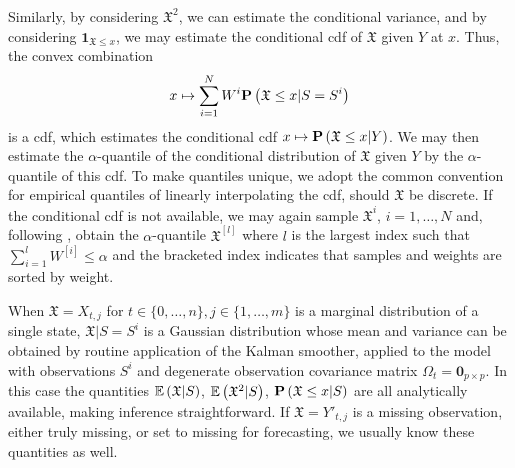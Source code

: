 Similarly, by considering $\mathfrak X^{2}$, we can estimate the conditional variance, and by considering $\mathbf 1 _{\mathfrak X \leq x}$, we may estimate the conditional \acrlong{cdf} of $\mathfrak X$ given $Y$ at $x$. Thus, the convex combination
$$
    x \mapsto \sum_{i = 1}^N W^{i} \P \left( \mathfrak X \leq x | S = S^{i} \right)
$$
is a \acrshort{cdf}, which estimates the conditional \acrshort{cdf} $x \mapsto \P \left( \mathfrak X \leq x | Y \right)$. We may then estimate the $\alpha$-quantile of the conditional distribution of $\mathfrak X$ given $Y$ by the $\alpha$-quantile of this \acrshort{cdf}. To make quantiles unique, we adopt the common convention for empirical quantiles of linearly interpolating the \acrshort{cdf}, should $\mathfrak X$ be discrete. If the conditional \acrshort{cdf} is not available, we may again sample $\mathfrak X^i$, $i = 1,\dots, N$ and, following \citep[Section 11.5.3]{Durbin2012Time}, obtain the $\alpha$-quantile $\mathfrak X^{[l]}$ where $l$ is the largest index such that $\sum_{i = 1}^l W^{[i]} \leq \alpha$ and the bracketed index indicates that samples and weights are sorted by weight.

When $\mathfrak X = X_{t,j}$ for $t \in \{0, \dots, n\}, j \in \{1, \dots, m\}$ is a marginal distribution of a single state, $\mathfrak X | S = S^{i}$ is a Gaussian distribution whose mean and variance can be obtained by routine application of the Kalman smoother, applied to the model with observations $S^{i}$ and degenerate observation covariance matrix $\Omega_{t} = \mathbf 0_{p \times p}$. In this case the quantities $\E \left( \mathfrak X | S \right)$, $\E \left( \mathfrak X^{2} |S \right)$, $\P \left( \mathfrak X \leq x | S \right)$ are all analytically available, making inference straightforward. 
If $\mathfrak X = Y'_{t, j}$ is a missing observation, either truly missing, or set to missing for forecasting, we usually know these quantities as well. 